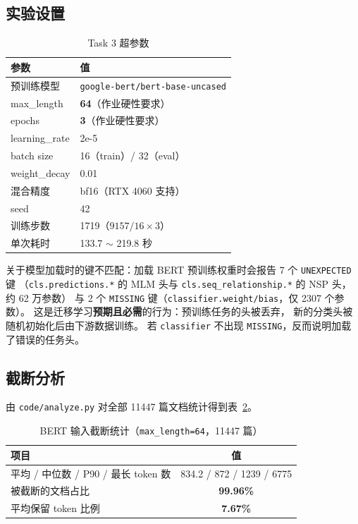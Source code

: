 \documentclass[12pt,a4paper]{ctexart}
\newcommand{\fpath}[1]{\texttt{#1}}
\newcommand{\best}[1]{\textbf{#1}}
\begin{document}
\subsection{实验设置}

\begin{table}[htbp]
\centering
\small
\caption{Task 3 超参数}
\label{tab:bert-param}
\begin{tabular}{ll}
\toprule
参数 & 值 \\
\midrule
预训练模型 & \fpath{google-bert/bert-base-uncased} \\
max\_length & \best{64}（作业硬性要求） \\
epochs & \best{3}（作业硬性要求） \\
learning\_rate & 2e-5 \\
batch size & 16（train）/ 32（eval） \\
weight\_decay & 0.01 \\
混合精度 & bf16（RTX 4060 支持） \\
seed & 42 \\
训练步数 & 1719（$9157/16\times3$） \\
单次耗时 & 133.7 $\sim$ 219.8 秒 \\
\bottomrule
\end{tabular}
\end{table}

关于模型加载时的键不匹配：加载 BERT 预训练权重时会报告 7 个 \fpath{UNEXPECTED} 键
（\fpath{cls.predictions.*} 的 MLM 头与 \fpath{cls.seq\_relationship.*} 的 NSP 头，约 62 万参数）
与 2 个 \fpath{MISSING} 键（\fpath{classifier.weight/bias}，仅 2307 个参数）。
这是迁移学习\textbf{预期且必需}的行为：预训练任务的头被丢弃，
新的分类头被随机初始化后由下游数据训练。
若 \fpath{classifier} 不出现 \fpath{MISSING}，反而说明加载了错误的任务头。

\subsection{截断分析}
\label{sec:bert-trunc}

由 \fpath{code/analyze.py} 对全部 11447 篇文档统计得到表~\ref{tab:trunc}。

\begin{table}[htbp]
\centering
\small
\caption{BERT 输入截断统计（\fpath{max\_length=64}，11447 篇）}
\label{tab:trunc}
\begin{tabular}{lc}
\toprule
项目 & 值 \\
\midrule
平均 / 中位数 / P90 / 最长 token 数 & 834.2 / 872 / 1239 / 6775 \\
被截断的文档占比 & \best{99.96\%} \\
平均保留 token 比例 & \best{7.67\%} \\
\bottomrule
\end{tabular}
\end{table}
\end{document}
